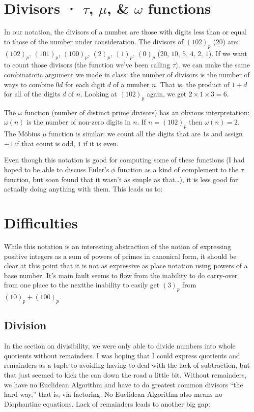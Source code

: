 \documentclass[12pt]{article}
\newcommand{\ppn}[1]{(#1)_p}
\begin{document}
\section*{Divisors · $\tau$, $\mu$, \& $\omega$ functions}
In our notation, the divisors of a number are those with digits less than or equal to those of the number under consideration. The divisors of $\ppn{102}$ (20) are: $\ppn{102}$, $\ppn{101}$, $\ppn{100}$, $\ppn{2}$, $\ppn{1}$, $\ppn{0}$ ($20$, $10$, $5$, $4$, $2$, $1$). If we want to count those divisors (the function we've been calling $\tau$), we can make the same combinatoric argument we made in class: the number of divisors is the number of ways to combine $0$\textendash$d$ for each digit $d$ of a number $n$. That is, the product of $1 + d$ for all of the digits $d$ of $n$. Looking at $\ppn{102}$ again, we get $2 \times 1 \times 3 = 6$.

The $\omega$ function (number of distinct prime divisors) has an obvious interpretation: $\omega(n)$ is the number of non-zero digits in $n$. If $n = \ppn{102}$ then $\omega(n) = 2$. The Möbius $\mu$ function is similar: we count all the digits that are $1$s and assign $-1$ if that count is odd, $1$ if it is even.

Even though this notation is good for computing some of these functions (I had hoped to be able to discuss Euler's $\phi$ function as a kind of complement to the $\tau$ function, but soon found that it wasn't as simple as that…), it is less good for actually doing anything with them. This leads us to:

\section*{Difficulties}
While this notation is an interesting abstraction of the notion of expressing positive integers as a sum of powers of primes in canonical form, it should be clear at this point that it is not as expressive as place notation using powers of a base number. It's main fault seems to flow from the inability to do carry-over from one place to the next\textemdash the inability to easily get $\ppn{3}$ from $\ppn{10} + \ppn{100}$.

\subsection*{Division}
In the section on divisibility, we were only able to divide numbers into whole quotients without remainders. I was hoping that I could express quotients and remainders as a tuple to avoiding having to deal with the lack of subtraction, but that just seemed to kick the can down the road a little bit. Without remainders, we have no Euclidean Algorithm and have to do greatest common divisors “the hard way,” that is, via factoring. No Euclidean Algorithm also means no Diophantine equations. Lack of remainders leads to another big gap:
\end{document}
